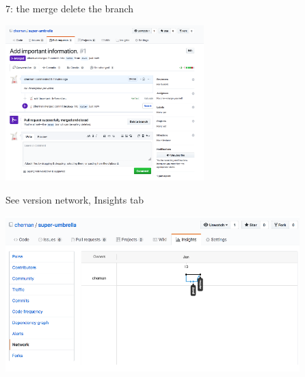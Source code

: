 \begin{frame}{ }
\begin{exampleblock}{7: the merge delete the branch}
    \begin{center}
    \includegraphics[height=6cm]{05_history/Images/FAIR_githubTP_mergeOk.png}
    \end{center}
\end{exampleblock}
\end{frame}
\begin{frame}{ }
\begin{exampleblock}{See version network, Insights tab}
    \begin{center}
    \includegraphics[height=6cm]{05_history/Images/FAIR_githubTP_insights.png}
    \end{center}
\end{exampleblock}
\end{frame}
